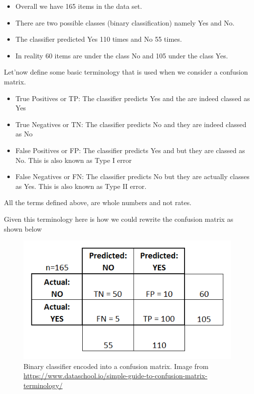 \begin{itemize}
\item Overall we have 165 items in the data set.
\item There are two possible classes (binary classification) namely Yes and No.
\item The classifier predicted Yes 110 times and No 55 times.
\item In reality 60 items are under the class No and 105 under the class Yes.
\end{itemize}

Let'now define some basic terminology that is used when we consider a confusion matrix.


\begin{itemize}
\item True Positives or TP: The classifier predicts Yes and the are indeed classed as Yes
\item True Negatives or TN: The classifier predicts No and they are indeed classed as No
\item False Positives or FP: The classifier predicts Yes and but they are  classed as No. This is also known as Type I error
\item False Negatives or FN: The classifier predicts No but they are actually classes as Yes. This is also known as Type II error.
\end{itemize} 

\begin{framed}
\begin{remark}

All the terms defined above, are whole numbers and not rates.
\end{remark}
\end{framed}

Given this terminology here is how we could rewrite the confusion matrix as shown below

\begin{figure}[!htb]
	\begin{center}
		\includegraphics[scale=0.480]{imgs/confusion_matrix2.png}
	\end{center}
	\caption{Binary classifier encoded into a confusion matrix. Image from \url{https://www.dataschool.io/simple-guide-to-confusion-matrix-terminology/}}
	\label{confusion_matrix2}
\end{figure}


